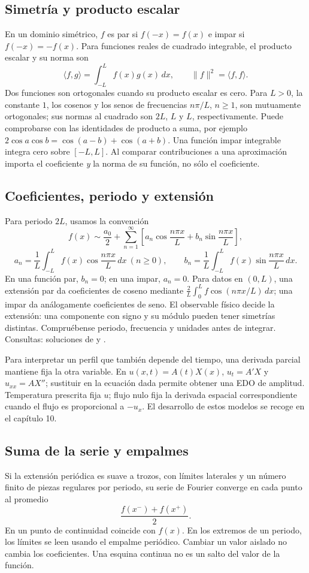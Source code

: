 %
\subsection*{Simetría y producto escalar}
\label{CH08-B01}
En un dominio simétrico, $f$ es par si $f(-x)=f(x)$ e impar si
$f(-x)=-f(x)$. Para funciones reales de cuadrado integrable, el producto
escalar y su norma son
\[
 \langle f,g\rangle=\int_{-L}^{L}f(x)g(x)\,dx,
 \qquad \|f\|^2=\langle f,f\rangle.
\]
Dos funciones son ortogonales cuando su producto escalar es cero.
Para $L>0$, la constante $1$, los cosenos y los senos de frecuencias
$n\pi/L$, $n\ge1$, son mutuamente ortogonales; sus normas al cuadrado
son $2L$, $L$ y $L$, respectivamente. Puede comprobarse con las
identidades de producto a suma, por ejemplo
$2\cos a\cos b=\cos(a-b)+\cos(a+b)$.
Una función impar integrable integra cero sobre $[-L,L]$.
Al comparar contribuciones a una aproximación importa el coeficiente
\emph{y} la norma de su función, no sólo el coeficiente.

%
\subsection*{Coeficientes, periodo y extensión}
\label{CH08-B02}
Para periodo $2L$, usamos la convención
\[
 f(x)\sim\frac{a_0}{2}+\sum_{n=1}^\infty
 \left[a_n\cos\frac{n\pi x}{L}+b_n\sin\frac{n\pi x}{L}\right],
\]
\[
 a_n=\frac1L\int_{-L}^{L}f(x)\cos\frac{n\pi x}{L}\,dx
 \ (n\ge0),\qquad
 b_n=\frac1L\int_{-L}^{L}f(x)\sin\frac{n\pi x}{L}\,dx.
\]
En una función par, $b_n=0$; en una impar, $a_n=0$. Para datos en
$(0,L)$, una extensión par da coeficientes de coseno mediante
$\frac2L\int_0^L f\cos(n\pi x/L)\,dx$; una impar da análogamente
coeficientes de seno. El observable físico decide la extensión: una
componente con signo y su módulo pueden tener simetrías distintas.
Compruébense periodo, frecuencia y unidades antes de integrar.
Consultas: soluciones de  y .

Para interpretar un perfil que también depende del tiempo, una derivada
parcial mantiene fija la otra variable. En $u(x,t)=A(t)X(x)$,
$u_t=A'X$ y $u_{xx}=AX''$; sustituir en la ecuación dada permite obtener
una EDO de amplitud. Temperatura prescrita fija $u$; flujo nulo fija la
derivada espacial correspondiente cuando el flujo es proporcional a
$-u_x$. El desarrollo de estos modelos se recoge en el capítulo 10.

%
\subsection*{Suma de la serie y empalmes}
\label{CH08-B03}
Si la extensión periódica es suave a trozos, con límites laterales y un
número finito de piezas regulares por periodo, su serie de Fourier
converge en cada punto al promedio
\[
 \frac{f(x^-)+f(x^+)}{2}.
\]
En un punto de continuidad coincide con $f(x)$. En los extremos de un
periodo, los límites se leen usando el empalme periódico. Cambiar un
valor aislado no cambia los coeficientes. Una esquina continua no es un
salto del valor de la función.

